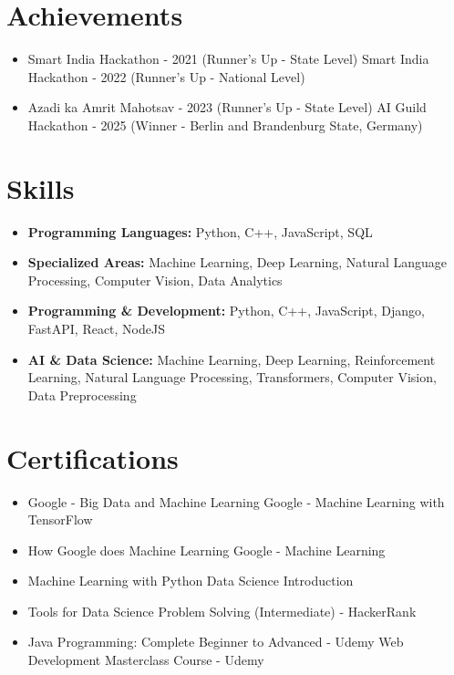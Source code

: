 \documentclass[a4paper,10pt]{article}
\begin{document}
\section*{Achievements}
\begin{itemize}
\item Smart India Hackathon - 2021 (Runner's Up - State Level) \hfill Smart India Hackathon - 2022 (Runner's Up - National Level)
\item Azadi ka Amrit Mahotsav - 2023 (Runner's Up - State Level) \hfill AI Guild Hackathon - 2025 (Winner - Berlin and Brandenburg State, Germany)
\end{itemize}

\section*{Skills}
\begin{itemize}
  \item \textbf{Programming Languages:} Python, C++, JavaScript, SQL
  \item \textbf{Specialized Areas:} Machine Learning, Deep Learning, Natural Language Processing, Computer Vision, Data Analytics
  \item \textbf{Programming \& Development:} Python, C++, JavaScript, Django, FastAPI, React, NodeJS
  \item \textbf{AI \& Data Science:} Machine Learning, Deep Learning, Reinforcement Learning, Natural Language Processing, Transformers, Computer Vision, Data Preprocessing
\end{itemize}

\section*{Certifications}
\begin{itemize}
\item Google - Big Data and Machine Learning \hfill Google - Machine Learning with TensorFlow
\item How Google does Machine Learning \hfill Google - Machine Learning
\item Machine Learning with Python \hfill Data Science Introduction
\item Tools for Data Science \hfill Problem Solving (Intermediate) - HackerRank
\item Java Programming: Complete Beginner to Advanced - Udemy \hfill Web Development Masterclass Course - Udemy
\end{itemize}
\end{document}
